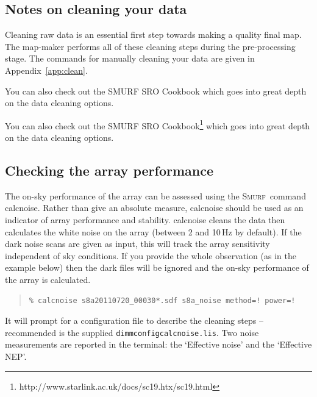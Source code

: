 \documentclass[twoside,11pt]{article}
\newcommand{\htmlref}[2]{#1}
\newenvironment{latexonly}{}{}
\newcommand{\latexhtml}[2]{#1}
\newcommand{\xref}[3]{#1}
\newcommand{\xlabel}[1]{}
\renewcommand{\_}{\texttt{\symbol{95}}}
\newenvironment{myquote}{\begin{quote}\begin{small}}{\end{small}\end{quote}}
\newcommand{\smurf}{\xref{\textsc{Smurf}}{sun258}{}}
\newcommand{\task}[1]{\textsf{#1}}
\newcommand{\calcnoise}{\xref{\task{calcnoise}}{sun258}{CALCNOISE}}
\newcommand{\cref}[3]{\latexhtml{#1~\ref{#2}}{\htmlref{#3}{#2}}}
\begin{document}
\subsection{\xlabel{clean}Notes on cleaning your data}
\label{sec:clean}

Cleaning raw data is an essential first step towards making a quality
final map. The map-maker performs all of these cleaning steps during
the pre-processing stage. The commands for manually cleaning your data
are given in \cref{Appendix}{app:clean}{Cleaning the Raw Data}.

\begin{htmlonly}
You can also check out the \xref{SMURF SRO Cookbook}{sc19}{} which
goes into great depth on the data cleaning options.
\end{htmlonly}
\begin{latexonly}
You can also check out the SMURF SRO
Cookbook{\footnote{http://www.starlink.ac.uk/docs/sc19.htx/sc19.html}}
which goes into great depth on the data cleaning options.
\end{latexonly}


\subsection{\xlabel{calcnoise}Checking the array performance}
\label{sec:calcnoise}

The on-sky performance of the array can be assessed using the \smurf\
command \calcnoise. Rather than give an absolute measure, \task{calcnoise}
should be used as an indicator of array performance and stability.
\task{calcnoise} cleans the data then calculates the
white noise on the array (between 2 and 10\,Hz by default). If the
dark noise scans are given as input, this will track the array
sensitivity independent of sky conditions. If you provide the whole
observation (as in the example below) then the dark files will be
ignored and the on-sky performance of the array is calculated.

\begin{myquote}
\begin{verbatim}
% calcnoise s8a20110720_00030*.sdf s8a_noise method=! power=!
\end{verbatim}
\end{myquote}
It will prompt for a configuration file to describe the cleaning
steps -- recommended is the supplied \texttt{dimmconfig\_calcnoise.lis}.
Two noise measurements are reported in the terminal: the
`Effective noise' and the `Effective NEP'.
\end{document}
